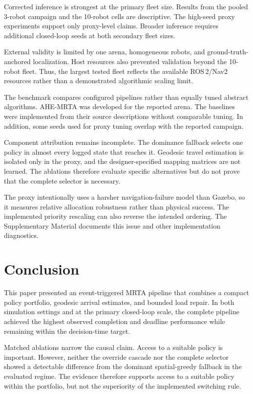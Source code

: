 \documentclass[10pt,letterpaper,onecolumn]{IEEEtran}
\begin{document}
Corrected inference is strongest at the primary fleet size. Results from the
pooled 3-robot campaign and the 10-robot cells are descriptive. The high-seed
proxy experiments support only proxy-level claims. Broader inference requires
additional closed-loop seeds at both secondary fleet sizes.

External validity is limited by one arena, homogeneous robots, and
ground-truth-anchored localization. Host resources also prevented validation
beyond the 10-robot fleet. Thus, the largest tested fleet reflects the
available ROS\,2/Nav2 resources rather than a demonstrated algorithmic scaling
limit.

The benchmark compares configured pipelines rather than equally tuned abstract
algorithms. AHE-MRTA was developed for the reported arena. The baselines were
implemented from their source descriptions without comparable tuning. In
addition, some seeds used for proxy tuning overlap with the reported campaign.

Component attribution remains incomplete. The dominance fallback selects one
policy in almost every logged state that reaches it. Geodesic travel estimation
is isolated only in the proxy, and the designer-specified mapping matrices are
not learned. The ablations therefore evaluate specific alternatives but do not
prove that the complete selector is necessary.

The proxy intentionally uses a harsher navigation-failure model than Gazebo,
so it measures relative allocation robustness rather than physical success.
The implemented priority rescaling can also reverse the intended ordering. The
Supplementary Material documents this issue and other implementation
diagnostics.

\section{Conclusion}
\label{sec:conclusion}

This paper presented an event-triggered MRTA pipeline that combines a compact
policy portfolio, geodesic arrival estimates, and bounded load repair. In both
simulation settings and at the primary closed-loop scale, the complete pipeline
achieved the highest observed completion and deadline performance while
remaining within the decision-time target.

Matched ablations narrow the causal claim. Access to a suitable policy is
important. However, neither the override cascade nor the complete selector
showed a detectable difference from the dominant spatial-greedy fallback in
the evaluated regime. The evidence therefore supports access to a suitable
policy within the portfolio, but not the superiority of the implemented
switching rule.



\end{document}
